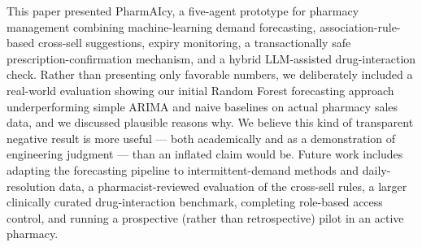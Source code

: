 \documentclass[12pt,a4paper]{article}
\begin{document}
This paper presented PharmAIcy, a five-agent prototype for pharmacy management combining machine-learning demand forecasting, association-rule-based cross-sell suggestions, expiry monitoring, a transactionally safe prescription-confirmation mechanism, and a hybrid LLM-assisted drug-interaction check. Rather than presenting only favorable numbers, we deliberately included a real-world evaluation showing our initial Random Forest forecasting approach underperforming simple ARIMA and naive baselines on actual pharmacy sales data, and we discussed plausible reasons why. We believe this kind of transparent negative result is more useful --- both academically and as a demonstration of engineering judgment --- than an inflated claim would be. Future work includes adapting the forecasting pipeline to intermittent-demand methods and daily-resolution data, a pharmacist-reviewed evaluation of the cross-sell rules, a larger clinically curated drug-interaction benchmark, completing role-based access control, and running a prospective (rather than retrospective) pilot in an active pharmacy.
\end{document}

